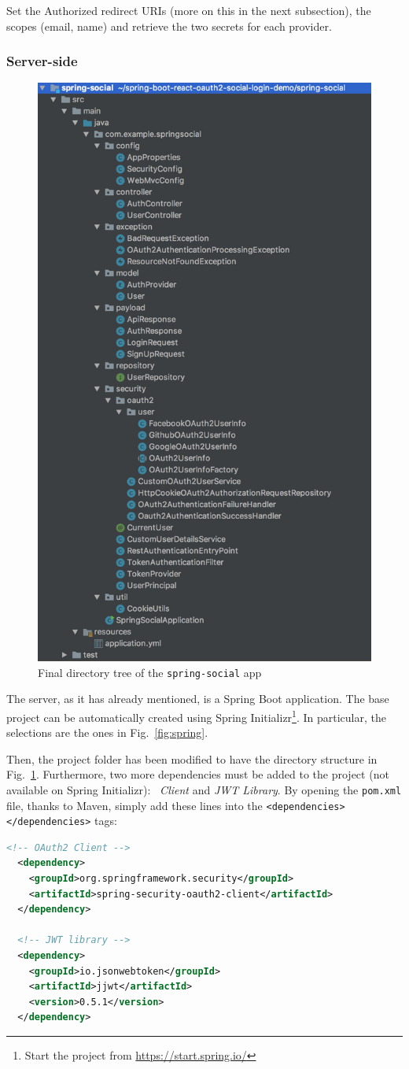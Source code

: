 \noindent Set the Authorized redirect URIs (more on this in the next subsection), the scopes (email, name) and retrieve the two secrets for each provider.

\subsubsection{Server-side}

\begin{figure}
  \begin{center}
    \includegraphics[width=0.3 \textwidth]{chapters/images/chp6/springdir.jpg}
  \end{center}
  \caption{Final directory tree of the \texttt{spring-social} app}
  \label{fig:dirsocial}
\end{figure}

The server, as it has already mentioned, is a Spring Boot application. The base project can be automatically created using Spring Initializr\footnote{Start the project from \url{https://start.spring.io/}}. In particular, the selections are the ones in Fig.~\ref{fig:spring}.

Then, the project folder has been modified to have the directory structure in Fig.~\ref{fig:dirsocial}. Furthermore, two more dependencies must be added to the project (not available on Spring Initializr): \textit{\oauth\ Client} and \textit{JWT Library}. By opening the \texttt{pom.xml} file, thanks to Maven, simply add these lines into the \texttt{<dependencies></dependencies>} tags:

\begin{lstlisting}[language=XML, basicstyle=\fontsize{9}{11}\ttfamily]
  <!-- OAuth2 Client -->
  <dependency>
    <groupId>org.springframework.security</groupId>
    <artifactId>spring-security-oauth2-client</artifactId>
  </dependency>

  <!-- JWT library -->
  <dependency>
    <groupId>io.jsonwebtoken</groupId>
    <artifactId>jjwt</artifactId>
    <version>0.5.1</version>
  </dependency>
\end{lstlisting}

